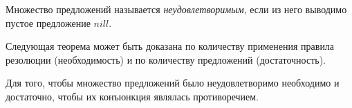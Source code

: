 \begin{definition}
	Множество предложений называется \emph{неудовлетворимым}, если из него выводимо пустое предложение $ nill $.
\end{definition}

Следующая теорема может быть доказана  по количеству применения правила резолюции (необходимость) и по количеству предложений (достаточность).

\begin{theorem}
	Для того, чтобы множество предложений было неудовлетворимо необходимо и достаточно, чтобы их конъюнкция являлась противоречием.
\end{theorem}
